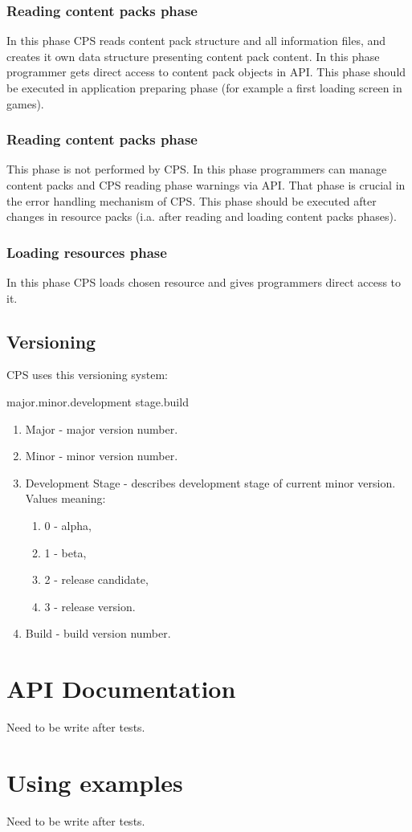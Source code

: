 \documentclass[a4paper]{report}
\begin{document}
\subsection{Reading content packs phase}
In this phase CPS reads content pack structure and all information files, and creates it own data structure presenting content pack content. In this phase programmer gets direct access to content pack objects in API. This phase should be executed in application preparing phase (for example a first loading screen in games).

\subsection{Reading content packs phase}
This phase is not performed by CPS. In this phase programmers can manage content packs and CPS reading phase warnings via API. That phase is crucial in the error handling mechanism of CPS. This phase should be executed after changes in resource packs (i.a. after reading and loading content packs phases).

\subsection{Loading resources phase}
In this phase CPS loads chosen resource and gives programmers direct access to it.

\section{Versioning}
CPS uses this versioning system:

major.minor.development stage.build

\begin{enumerate}
\item Major - major version number.
\item Minor - minor version number.
\item Development Stage - describes development stage of current minor version. Values meaning:
\begin{enumerate}
\item 0 - alpha,
\item 1 - beta,
\item 2 - release candidate,
\item 3 - release version.
\end{enumerate}
\item Build - build version number.
\end{enumerate}

\chapter{API Documentation}
Need to be write after tests.

\chapter{Using examples}
Need to be write after tests.
\end{document}
